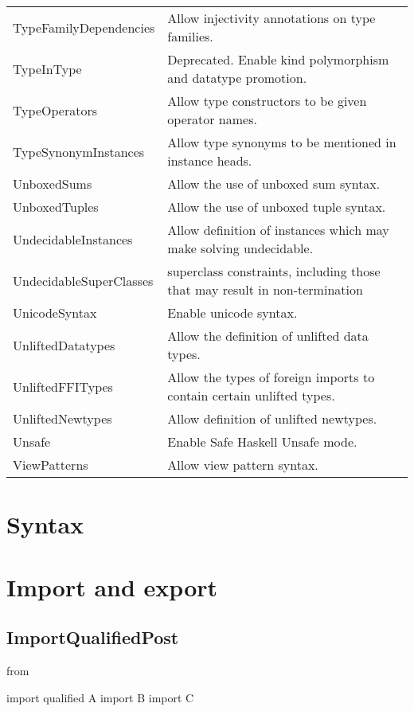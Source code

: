 \documentclass[openany, 12pt]{book}
\begin{document}
\begin{longtable}{ll}
	TypeFamilyDependencies     & Allow injectivity annotations on type families.                            \\
	TypeInType                 & Deprecated. Enable kind polymorphism and datatype promotion.               \\
	TypeOperators              & Allow type constructors to be given operator names.                        \\
	TypeSynonymInstances       & Allow type synonyms to be mentioned in instance heads.                     \\
	UnboxedSums                & Allow the use of unboxed sum syntax.                                       \\
	UnboxedTuples              & Allow the use of unboxed tuple syntax.                                     \\
	UndecidableInstances       & Allow definition of instances which may make solving undecidable.          \\
	UndecidableSuperClasses    & superclass constraints, including those that may result in non-termination \\
	UnicodeSyntax              & Enable unicode syntax.                                                     \\
	UnliftedDatatypes          & Allow the definition of unlifted data types.                               \\
	UnliftedFFITypes           & Allow the types of foreign imports to contain certain unlifted types.      \\
	UnliftedNewtypes           & Allow definition of unlifted newtypes.                                     \\
	Unsafe                     & Enable Safe Haskell Unsafe mode.                                           \\
	ViewPatterns               & Allow view pattern syntax.                                                 \\
\end{longtable}

\part{Syntax}
\part{Import and export}

\chapter{ImportQualifiedPost}
from
\begin{haskell}{}
import qualified A
import           B
import           C
\end{haskell}
\end{document}
